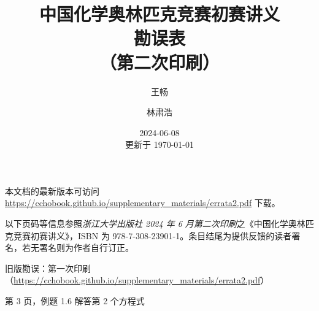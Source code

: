 \documentclass{errata}
\title{中国化学奥林匹克竞赛初赛讲义 \\ {\bfseries 勘误表} \\ （第二次印刷）}
\author{王畅 \and 林肃浩}
\date{2024-06-08 \\ 更新于 \today}
\begin{document}
    \maketitle
    本文档的最新版本可访问 \url{https://cchobook.github.io/supplementary_materials/errata2.pdf} 下载。

    以下页码等信息参照\emph{浙江大学出版社 2024 年 6 月第二次印刷}之《中国化学奥林匹克竞赛初赛讲义》，ISBN 为 978-7-308-23901-1。条目结尾为提供反馈的读者署名，若无署名则为作者自行订正。
    
    旧版勘误：第一次印刷（\url{https://cchobook.github.io/supplementary_materials/errata2.pdf}）

    \begin{Errata}
        \item[第 3 页，例题 1.6 解答第 2 个方程式]
            \Orig {}
            \Corr {}
    \end{Errata}

    \renewcommand{\em}{\itshape}
    \renewcommand*{\bibfont}{\footnotesize}
    \renewcommand{\refname}{参考文献}
    \renewcommand{\bibname}{参考文献}
    \printbibliography
\end{document}
